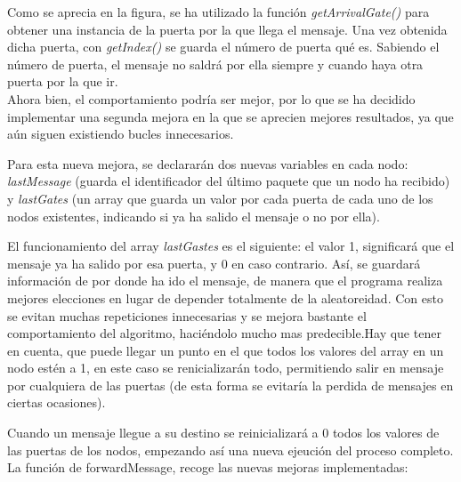 \documentclass{article}
\begin{document}
		
		Como se aprecia en la figura, se ha utilizado la función \textit{getArrivalGate()} para obtener una instancia de la puerta por la que llega el mensaje. Una vez obtenida dicha puerta, con \textit{getIndex()} se guarda el número de  puerta qué es. Sabiendo el número de puerta, el mensaje no saldrá por ella siempre y cuando haya otra puerta por la que ir.\\
		
		Ahora bien, el comportamiento podría ser mejor, por lo que se ha decidido implementar una segunda mejora en la que se aprecien mejores resultados, ya que aún siguen existiendo bucles innecesarios.
		
		Para esta nueva mejora, se declararán dos nuevas variables en cada nodo: \textit{lastMessage} (guarda el identificador del último paquete que un nodo ha recibido) y \textit{lastGates} (un array que guarda un valor por cada puerta de cada uno de los nodos existentes, indicando si ya ha salido el mensaje o no por ella). 
		
		El funcionamiento del array \textit{lastGastes} es el siguiente: el valor 1, significará que el mensaje ya ha salido por esa puerta, y 0 en caso contrario. Así, se guardará información de por donde ha ido el mensaje, de manera que el programa realiza mejores elecciones en lugar de depender totalmente de la aleatoreidad. Con esto se evitan muchas repeticiones innecesarias y se mejora bastante el comportamiento del algoritmo, haciéndolo mucho mas predecible.Hay que tener en cuenta, que puede llegar un punto en el que todos los valores del array en un nodo estén a 1, en este caso se renicializarán todo, permitiendo salir en mensaje por cualquiera de las puertas (de esta forma se evitaría la perdida de mensajes en ciertas ocasiones).
		
		Cuando un mensaje llegue a su destino se reinicializará a 0 todos los valores de las puertas de los nodos, empezando así una nueva ejeución del proceso completo.\\
		
		La función de forwardMessage, recoge las nuevas mejoras implementadas:
		
\end{document}
